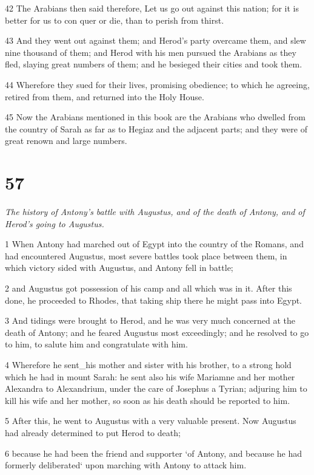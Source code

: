 42 The Arabians then said therefore, Let us go out against this nation; for it is better for us to con quer or die, than to perish from thirst. 

43 And they went out against them; and Herod’s party overcame them, and slew nine thousand of them; and Herod with his men pursued the Arabians as they fled, slaying great numbers of them; and he besieged their cities and took them. 

44 Wherefore they sued for their lives, promising obedience; to which he agreeing, retired from them, and returned into the Holy House. 

45 Now the Arabians mentioned in this book are the Arabians who dwelled from the country of Sarah as far as to Hegiaz and the adjacent parts; and they were of great renown and large numbers. 


\chapter{57}

\par \textit{The history of Antony's battle with Augustus, and of the death of Antony, and of Herod’s going to Augustus.}

1 When Antony had marched out of Egypt into the country of the Romans, and had encountered Augustus, most severe battles took place between them, in which victory sided with Augustus, and Antony fell in battle; 

2 and Augustus got possession of his camp and all which was in it. After this done, he proceeded to Rhodes, that taking ship there he might pass into Egypt. 

3 And tidings were brought to Herod, and he was very much concerned at the death of Antony; and he feared Augustus most exceedingly; and he resolved to go to him, to salute him and congratulate with him. 

4 Wherefore he sent_his mother and sister with his brother, to a strong hold which he had in mount Sarah: he sent also his wife Mariamne and her mother Alexandra to Alexandrium, under the care of Josephus a Tyrian; adjuring him to kill his wife and her mother, so soon as his death should be reported to him. 

5 After this, he went to Augustus with a very valuable present. Now Augustus had already determined to put Herod to death; 

6 because he had been the friend and supporter ‘of Antony, and because he had formerly deliberated‘ upon marching with Antony to attack him. 

